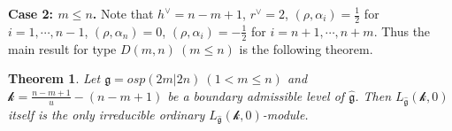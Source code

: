 \documentclass[12pt]{article}
\newtheorem{thm}{Theorem}[section]
\begin{document}
{\bf Case 2: $m\leq n$.}
Note that $h^{\vee}=n-m+1$, $r^\vee=2$,
$(\rho, \alpha_i)=\frac{1}{2}$ for $i=1,\cdots,n-1$, $(\rho, \alpha_n)=0$,
$(\rho, \alpha_i)=-\frac{1}{2}$ for $i=n+1,\cdots,n+m$.
Thus the main result for type $D(m,n)~(m\leq n)$ is the following theorem.
\begin{thm}
Let $\mathfrak{g}=osp(2m|2n)~(1<m\leq n)$ and
$\mathcal{k}=\frac{n-m+1}{u}-(n-m+1)$ be a boundary admissible level of $\widehat{\mathfrak{g}}$.
Then $L_{\widehat{\mathfrak{g}}}(\mathcal{k},0)$ itself is the only irreducible ordinary $L_{\widehat{\mathfrak{g}}}(\mathcal{k},0)$-module.
\end{thm}
\end{document}
